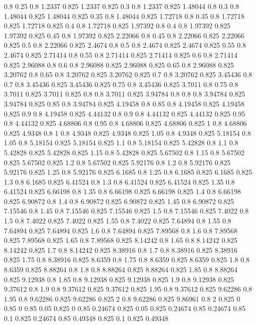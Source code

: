 0.8 0.25
0.8 1.2337
0.825 1.2337
0.825 0.3
0.8 1.2337
0.825 1.48044
0.8 0.3
0.8 1.48044
0.825 1.48044
0.825 0.35
0.8 1.48044
0.825 1.72718
0.8 0.35
0.8 1.72718
0.825 1.72718
0.825 0.4
0.8 1.72718
0.825 1.97392
0.8 0.4
0.8 1.97392
0.825 1.97392
0.825 0.45
0.8 1.97392
0.825 2.22066
0.8 0.45
0.8 2.22066
0.825 2.22066
0.825 0.5
0.8 2.22066
0.825 2.4674
0.8 0.5
0.8 2.4674
0.825 2.4674
0.825 0.55
0.8 2.4674
0.825 2.71414
0.8 0.55
0.8 2.71414
0.825 2.71414
0.825 0.6
0.8 2.71414
0.825 2.96088
0.8 0.6
0.8 2.96088
0.825 2.96088
0.825 0.65
0.8 2.96088
0.825 3.20762
0.8 0.65
0.8 3.20762
0.825 3.20762
0.825 0.7
0.8 3.20762
0.825 3.45436
0.8 0.7
0.8 3.45436
0.825 3.45436
0.825 0.75
0.8 3.45436
0.825 3.7011
0.8 0.75
0.8 3.7011
0.825 3.7011
0.825 0.8
0.8 3.7011
0.825 3.94784
0.8 0.8
0.8 3.94784
0.825 3.94784
0.825 0.85
0.8 3.94784
0.825 4.19458
0.8 0.85
0.8 4.19458
0.825 4.19458
0.825 0.9
0.8 4.19458
0.825 4.44132
0.8 0.9
0.8 4.44132
0.825 4.44132
0.825 0.95
0.8 4.44132
0.825 4.68806
0.8 0.95
0.8 4.68806
0.825 4.68806
0.825 1
0.8 4.68806
0.825 4.9348
0.8 1
0.8 4.9348
0.825 4.9348
0.825 1.05
0.8 4.9348
0.825 5.18154
0.8 1.05
0.8 5.18154
0.825 5.18154
0.825 1.1
0.8 5.18154
0.825 5.42828
0.8 1.1
0.8 5.42828
0.825 5.42828
0.825 1.15
0.8 5.42828
0.825 5.67502
0.8 1.15
0.8 5.67502
0.825 5.67502
0.825 1.2
0.8 5.67502
0.825 5.92176
0.8 1.2
0.8 5.92176
0.825 5.92176
0.825 1.25
0.8 5.92176
0.825 6.1685
0.8 1.25
0.8 6.1685
0.825 6.1685
0.825 1.3
0.8 6.1685
0.825 6.41524
0.8 1.3
0.8 6.41524
0.825 6.41524
0.825 1.35
0.8 6.41524
0.825 6.66198
0.8 1.35
0.8 6.66198
0.825 6.66198
0.825 1.4
0.8 6.66198
0.825 6.90872
0.8 1.4
0.8 6.90872
0.825 6.90872
0.825 1.45
0.8 6.90872
0.825 7.15546
0.8 1.45
0.8 7.15546
0.825 7.15546
0.825 1.5
0.8 7.15546
0.825 7.4022
0.8 1.5
0.8 7.4022
0.825 7.4022
0.825 1.55
0.8 7.4022
0.825 7.64894
0.8 1.55
0.8 7.64894
0.825 7.64894
0.825 1.6
0.8 7.64894
0.825 7.89568
0.8 1.6
0.8 7.89568
0.825 7.89568
0.825 1.65
0.8 7.89568
0.825 8.14242
0.8 1.65
0.8 8.14242
0.825 8.14242
0.825 1.7
0.8 8.14242
0.825 8.38916
0.8 1.7
0.8 8.38916
0.825 8.38916
0.825 1.75
0.8 8.38916
0.825 8.6359
0.8 1.75
0.8 8.6359
0.825 8.6359
0.825 1.8
0.8 8.6359
0.825 8.88264
0.8 1.8
0.8 8.88264
0.825 8.88264
0.825 1.85
0.8 8.88264
0.825 9.12938
0.8 1.85
0.8 9.12938
0.825 9.12938
0.825 1.9
0.8 9.12938
0.825 9.37612
0.8 1.9
0.8 9.37612
0.825 9.37612
0.825 1.95
0.8 9.37612
0.825 9.62286
0.8 1.95
0.8 9.62286
0.825 9.62286
0.825 2
0.8 9.62286
0.825 9.86961
0.8 2
0.825 0
0.85 0
0.85 0.05
0.825 0
0.85 0.24674
0.825 0.05
0.825 0.24674
0.85 0.24674
0.85 0.1
0.825 0.24674
0.85 0.49348
0.825 0.1
0.825 0.49348
